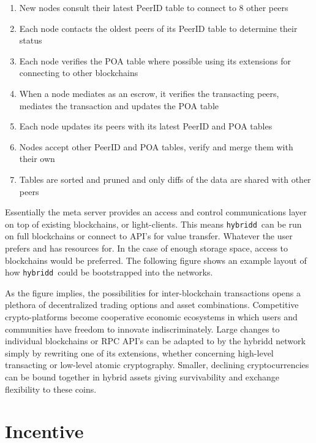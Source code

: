 \documentclass[a4paper,fullpack]{article}
\newcommand{\hybridd}{\texttt{hybridd}\, }
\begin{document}
\begin{enumerate}
\item New nodes consult their latest PeerID table to connect to 8 other peers
\item Each node contacts the oldest peers of its PeerID table to determine their status
\item Each node verifies the POA table where possible using its extensions
	    for connecting to other blockchains
\item When a node mediates as an escrow, it verifies the transacting peers,
	    mediates the transaction and updates the POA table
\item Each node updates its peers with its latest PeerID and POA tables
\item Nodes accept other PeerID and POA tables, verify and merge them with their own
\item Tables are sorted and pruned and only diffs of the data are shared with other peers
\end{enumerate}

Essentially the meta server provides an access and control communications layer on top of existing blockchains, or light-clients. This means \hybridd can be run on full blockchains or connect to API's for value transfer. Whatever the user prefers and has resources for. In the case of enough storage space, access to blockchains would be preferred. The following figure shows an example layout of how \hybridd could be bootstrapped into the networks.

As the figure implies, the possibilities for inter-blockchain transactions opens a plethora of decentralized trading options and asset combinations. Competitive crypto-platforms become cooperative economic ecosystems in which users and communities have freedom to innovate indiscriminately. Large changes to individual blockchains or RPC API's can be adapted to by the hybridd network simply by rewriting one of its extensions, whether concerning high-level transacting or low-level atomic cryptography. Smaller, declining cryptocurrencies can be bound together in hybrid assets giving survivability and exchange flexibility to these coins.


\section{Incentive}
\end{document}
